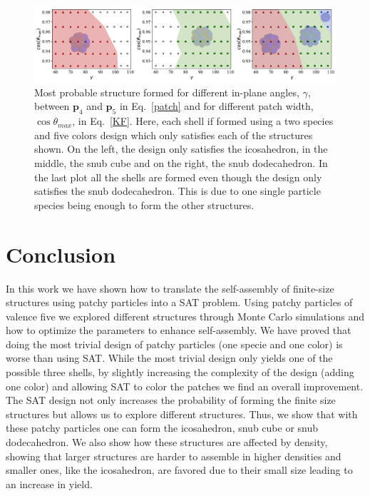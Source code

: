 \documentclass[a4paper, amsfonts, amssymb, amsmath, reprint, showkeys, nofootinbib, twoside]{revtex4-1}
\begin{document}
\begin{figure}[t]
	\includegraphics{fig6.pdf}
	\caption{\label{Sol} Most probable structure formed for different in-plane angles, $\gamma$, between $\textbf{p}_4$ and $\textbf{p}_5$ in Eq.~\ref{patch} and for different patch width, $\cos\theta_{max}$, in Eq.~\ref{KF}. Here, each shell if formed using a two species and five colors design which only satisfies each of the structures shown. On the left, the design only satisfies the icosahedron, in the middle, the snub cube and on the right, the snub dodecahedron. In the last plot all the shells are formed even though the design only satisfies the snub dodecahedron. This is due to one single particle species being enough to form the other structures.}
\end{figure}

\section{Conclusion}

In this work we have shown how to translate the self-assembly of finite-size structures using patchy particles into a SAT problem. Using patchy particles of valence five we explored different structures through Monte Carlo simulations and how to optimize the parameters to enhance self-assembly. We have proved that doing the most trivial design of patchy particles (one specie and one color) is worse than using SAT. While the most trivial design only yields one of the possible three shells, by slightly increasing the complexity of the design (adding one color) and allowing SAT to color the patches we find an overall improvement. The SAT design not only increases the probability of forming the finite size structures but allows us to explore different structures. Thus, we show that with these patchy particles one can form the icosahedron, snub cube or snub dodecahedron. We also show how these structures are affected by density, showing that larger structures are harder to assemble in higher densities and smaller ones, like the icosahedron, are favored due to their small size leading to an increase in yield.
\end{document}
